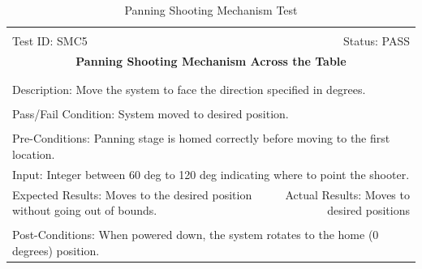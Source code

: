 \documentclass[11pt]{article}
\begin{document}
\begin{center}
\begin{table}[H]
\begin{tabular}{|l r|}\hline&\\[-2mm]
	Test ID: SMC5	&Status: PASS\\[-3mm]
	\multicolumn{2}{|c|}{\textbf{\large{Panning Shooting Mechanism Across the Table}}}\\&\\\hline&\\[-3mm]
	\multicolumn{2}{|p{\textwidth}|}{Description: Move the system to face the direction specified in degrees.}\\[1mm]\hline&\\[-3mm]
	\multicolumn{2}{|p{\textwidth}|}{Pass/Fail Condition: System moved to desired position.}\\[1mm]\hline&\\[-3mm]
	\multicolumn{2}{|p{\textwidth}|}{Pre-Conditions: Panning stage is homed correctly before moving to the first location.}\\[4mm]
	\multicolumn{2}{|p{\textwidth}|}{Input: Integer between 60 deg to 120 deg indicating where to point the shooter.}\\[2mm]\hline
	\multicolumn{1}{|p{0.49\textwidth}}{Expected Results: Moves to the desired position without going out of bounds.
}	&\multicolumn{1}{|p{0.45\textwidth}|}{Actual Results: Moves to desired positions}\\\hline&\\[-3mm]
	\multicolumn{2}{|p{\textwidth}|}{Post-Conditions: When powered down, the system rotates to the home (0 degrees) position.}\\\hline
\end{tabular}
\caption{Panning Shooting Mechanism Test}
\end{table}
\end{center}
\end{document}
